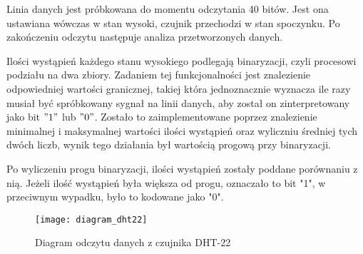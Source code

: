 Linia danych jest próbkowana do momentu odczytania 40 bitów. Jest ona ustawiana wówczas w stan wysoki, czujnik przechodzi w stan spoczynku. Po zakończeniu odczytu następuje analiza przetworzonych danych.

Ilości wystąpień każdego stanu wysokiego podlegają binaryzacji, czyli procesowi podziału na dwa zbiory. Zadaniem tej funkcjonalności jest znalezienie odpowiedniej wartości granicznej, takiej która jednoznacznie wyznacza ile razy musiał być spróbkowany sygnał na linii danych, aby został on zinterpretowany jako bit $"1"$ lub $"0"$. Zostało to zaimplementowane poprzez znalezienie minimalnej i maksymalnej wartości ilości wystąpień oraz wyliczniu średniej tych dwóch liczb, wynik tego działania był wartością progową przy binaryzacji.

Po wyliczeniu progu binaryzacji, ilości wystąpień zostały poddane porównaniu z nią. Jeżeli ilość wystąpień była większa od progu, oznaczało to bit "1", w przeciwnym wypadku, było to kodowane jako "0".
\begin{figure}[h]
\centering
\texttt{[image: diagram\_dht22]}
\caption{Diagram odczytu danych z czujnika DHT-22}
\label{fig:diagram_dht22}
\end{figure}